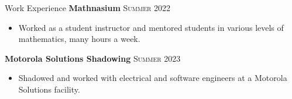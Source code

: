 \medskip

\begin{resume_section}{Work Experience}
	\textbf{Mathnasium} \hspace*{\fill} \textsc{Summer 2022}

	\begin{itemize}
		\setlength{\labelsep}{0.1in}
		\item Worked as a student instructor and mentored students in various levels of mathematics, many hours a week.
	\end{itemize}

	\textbf{Motorola Solutions Shadowing} \hspace*{\fill} \textsc{Summer 2023}

	\begin{itemize}
		\setlength{\labelsep}{0.1in}
		\item Shadowed and worked with electrical and software engineers at a Motorola Solutions facility.
	\end{itemize}
\end{resume_section}
